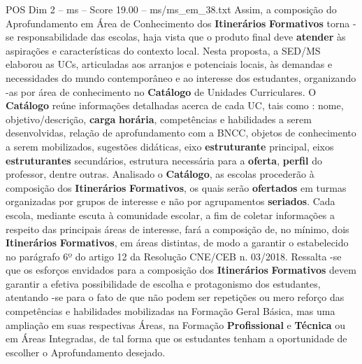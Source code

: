 \begin{textsample}{POS Dim 2 – ms – Score 19.00 – ms/ms\_em\_38.txt}
Assim, a composição do Aprofundamento em Área de Conhecimento dos \textbf{Itinerários} \textbf{Formativos} torna -se responsabilidade das escolas, haja vista que o produto final deve \textbf{atender} às aspirações e características do contexto local.
Nesta proposta, a SED/MS elaborou as UCs, articuladas aos arranjos e potenciais locais, às demandas e necessidades do mundo contemporâneo e ao interesse dos estudantes, organizando -as por área de conhecimento no \textbf{Catálogo} de Unidades Curriculares.
O \textbf{Catálogo} reúne informações detalhadas acerca de cada UC, tais como : nome, objetivo/descrição, \textbf{carga} \textbf{horária}, competências e habilidades a serem desenvolvidas, relação de aprofundamento com a BNCC, objetos de conhecimento a serem mobilizados, sugestões didáticas, eixo \textbf{estruturante} principal, eixos \textbf{estruturantes} secundários, estrutura necessária para a \textbf{oferta}, \textbf{perfil} do professor, dentre outras.
Analisado o \textbf{Catálogo}, as escolas procederão à composição dos \textbf{Itinerários} \textbf{Formativos}, os quais serão \textbf{ofertados} em turmas organizadas por grupos de interesse e não por agrupamentos \textbf{seriados}.
Cada escola, mediante escuta à comunidade escolar, a fim de coletar informações a respeito das principais áreas de interesse, fará a composição de, no mínimo, dois \textbf{Itinerários} \textbf{Formativos}, em áreas distintas, de modo a garantir o estabelecido no parágrafo 6º do artigo 12 da Resolução CNE/CEB n. 03/2018.
Ressalta -se que os esforços envidados para a composição dos \textbf{Itinerários} \textbf{Formativos} devem garantir a efetiva possibilidade de escolha e protagonismo dos estudantes, atentando -se para o fato de que não podem ser repetições ou mero reforço das competências e habilidades mobilizadas na Formação Geral Básica, mas uma ampliação em suas respectivas Áreas, na Formação \textbf{Profissional} e \textbf{Técnica} ou em Áreas Integradas, de tal forma que os estudantes tenham a oportunidade de escolher o Aprofundamento desejado.

\end{textsample}
